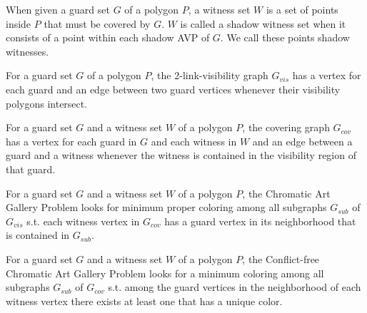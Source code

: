 \begin{definition}
When given a guard set $G$ of a polygon $P$, a witness set $W$ is a set of points inside $P$ that must be covered by $G$. $W$ is called a shadow witness set when it consists of a point within each shadow AVP of $G$. We call these points shadow witnesses.
\end{definition}

\begin{definition}
For a guard set $G$ of a polygon $P$, the 2-link-visibility graph $G_{vis}$ has a vertex for each guard and an edge between two guard vertices whenever their visibility polygons intersect.
\end{definition}

\begin{definition}
For a guard set $G$ and a witness set $W$ of a polygon $P$, the covering graph $G_{cov}$ has a vertex for each guard in $G$ and each witness in $W$ and an edge between a guard and a witness whenever the witness is contained in the visibility region of that guard.
\end{definition}

\begin{definition}
For a guard set $G$ and a witness set $W$ of a polygon $P$, the Chromatic Art Gallery Problem looks for minimum proper coloring among all subgraphs $G_{sub}$ of $G_{vis}$ s.t. each witness vertex in $G_{cov}$ has a guard vertex in its neighborhood that is contained in $G_{sub}$.
\end{definition}

\begin{definition}
For a guard set $G$ and a witness set $W$ of a polygon $P$, the Conflict-free Chromatic Art Gallery Problem looks for a minimum coloring among all subgraphs $G_{sub}$ of $G_{cov}$ s.t. among the guard vertices in the neighborhood of each witness vertex there exists at least one that has a unique color.
\end{definition}
